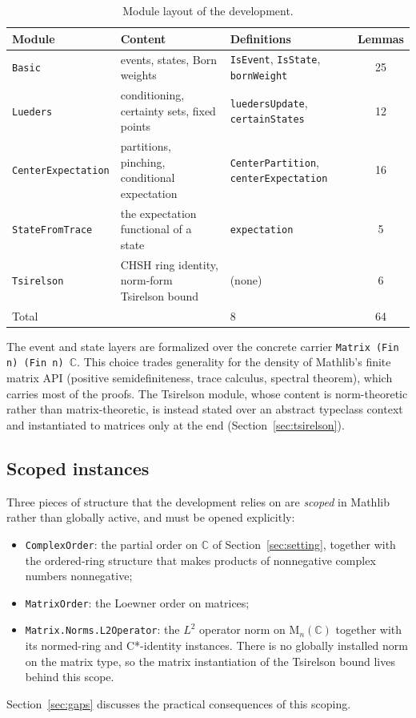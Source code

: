 \documentclass[11pt]{article}
\renewcommand{\_}{\textunderscore\allowbreak}
\theoremstyle{remark}
\newcommand{\C}{\mathbb C}
\newcommand{\Mn}{\mathrm{M}_n(\C)}
\begin{document}
\begin{table}[ht]
\centering
\small
\begin{tabular}{@{}lL{4.9cm}L{4.6cm}c@{}}
\toprule
Module & Content & Definitions & Lemmas\\
\midrule
\texttt{Basic} & events, states, Born weights & \texttt{IsEvent}, \texttt{IsState}, \texttt{bornWeight} & 25\\
\texttt{Lueders} & conditioning, certainty sets, fixed points & \texttt{luedersUpdate}, \texttt{certainStates} & 12\\
\texttt{CenterExpectation} & partitions, pinching, conditional expectation & \texttt{CenterPartition}, \texttt{centerExpectation} & 16\\
\texttt{StateFromTrace} & the expectation functional of a state & \texttt{expectation} & 5\\
\texttt{Tsirelson} & CHSH ring identity, norm-form Tsirelson bound & (none) & 6\\
\midrule
Total & & 8 & 64\\
\bottomrule
\end{tabular}
\caption{Module layout of the development.}
\label{tab:modules}
\end{table}

The event and state layers are formalized over the concrete carrier \texttt{Matrix (Fin n) (Fin n) $\C$}. This choice trades generality for the density of Mathlib's finite matrix API (positive semidefiniteness, trace calculus, spectral theorem), which carries most of the proofs. The Tsirelson module, whose content is norm-theoretic rather than matrix-theoretic, is instead stated over an abstract typeclass context and instantiated to matrices only at the end (Section~\ref{sec:tsirelson}).

\subsection{Scoped instances}

Three pieces of structure that the development relies on are \emph{scoped} in Mathlib rather than globally active, and must be opened explicitly:
\begin{itemize}
\item \texttt{ComplexOrder}: the partial order on $\C$ of Section~\ref{sec:setting}, together with the ordered-ring structure that makes products of nonnegative complex numbers nonnegative;
\item \texttt{MatrixOrder}: the Loewner order on matrices;
\item \texttt{Matrix.Norms.L2Operator}: the $L^2$ operator norm on $\Mn$ together with its normed-ring and C*-identity instances. There is no globally installed norm on the matrix type, so the matrix instantiation of the Tsirelson bound lives behind this scope.
\end{itemize}
Section~\ref{sec:gaps} discusses the practical consequences of this scoping.
\end{document}
